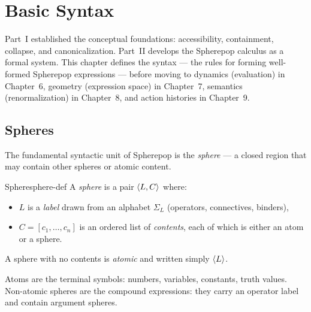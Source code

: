 
\chapter{Basic Syntax}



Part~I established the conceptual foundations: accessibility, containment,
collapse, and canonicalization. Part~II develops the Spherepop calculus
as a formal system. This chapter defines the syntax — the rules for forming
well-formed Spherepop expressions — before moving to dynamics (evaluation)
in Chapter~6, geometry (expression space) in Chapter~7, semantics
(renormalization) in Chapter~8, and action histories in Chapter~9.

\section{Spheres}

The fundamental syntactic unit of Spherepop is the \emph{sphere} — a
closed region that may contain other spheres or atomic content.

\begin{definition}{Sphere}{sphere-def}
  A \emph{sphere} is a pair $\langle L, C \rangle$ where:
  \begin{itemize}
    \item $L$ is a \emph{label} drawn from an alphabet $\Sigma_L$
          (operators, connectives, binders),
    \item $C = [c_1, \ldots, c_n]$ is an ordered list of \emph{contents},
          each of which is either an atom or a sphere.
  \end{itemize}
  A sphere with no contents is \emph{atomic} and written simply $\langle L \rangle$.
\end{definition}

Atoms are the terminal symbols: numbers, variables, constants, truth values.
Non-atomic spheres are the compound expressions: they carry an operator
label and contain argument spheres.

